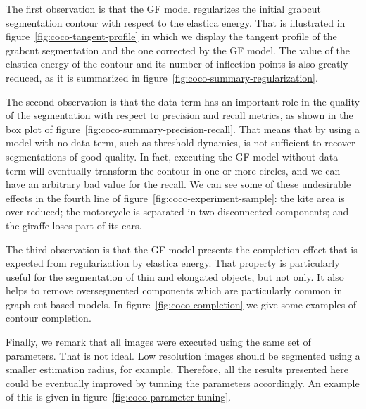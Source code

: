 \documentclass[smallextended]{svjour3}
\begin{document}
%
%
%
The first observation is that the GF model regularizes the initial grabcut segmentation contour with respect to the elastica energy. That is illustrated in figure~\ref{fig:coco-tangent-profile} in which we display the tangent profile of the grabcut segmentation and the one corrected by the GF model. The value of the elastica energy of the contour and its number of inflection points is also greatly reduced, as it is summarized in figure~\ref{fig:coco-summary-regularization}.

The second observation is that the data term has an important role in the quality of the segmentation with respect to precision and recall metrics, as shown in the box plot of figure~\ref{fig:coco-summary-precision-recall}. That means that by using a model with no data term, such as threshold dynamics, is not sufficient to recover segmentations of good quality. In fact, executing the GF model without data term will eventually transform the contour in one or more circles, and we can have an arbitrary bad value for the recall. We can see some of these undesirable effects in the fourth line of figure~\ref{fig:coco-experiment-sample}: the kite area is over reduced; the motorcycle is separated in two disconnected components; and the giraffe loses part of its ears.

The third observation is that the GF model presents the completion effect that is expected from regularization by elastica energy. That property is particularly useful for the segmentation of thin and elongated objects, but not only. It also helps to remove oversegmented components which are particularly common in graph cut based models. In figure~\ref{fig:coco-completion} we give some examples of contour completion.

Finally, we remark that all images were executed using the same set of parameters. That is not ideal. Low resolution images should be segmented using a smaller estimation radius, for example. Therefore, all the results presented here could be eventually improved by tunning the parameters accordingly. An example of this is given in figure~\ref{fig:coco-parameter-tuning}.
\end{document}
